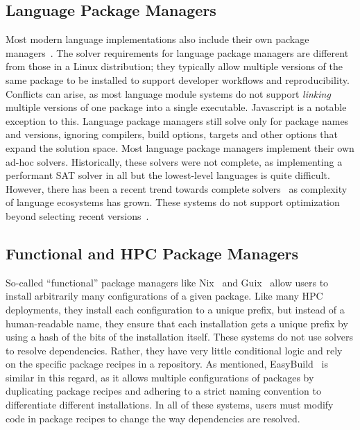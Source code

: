 \subsection{Language Package Managers}

Most modern language implementations also include their own package
managers~\cite{npm,pip,cargo,weizenbaum:pubgrub18}. The solver requirements for language
package managers are different from those in a Linux distribution; they typically allow
multiple versions of the same package to be installed to support developer workflows and
reproducibility. Conflicts can arise, as most language module systems do not support
{\it linking} multiple versions of one package into a single executable. Javascript is a
notable exception to this. Language package managers still solve only for package
names and versions, ignoring compilers, build options, targets and other options that
expand the solution space. Most language package managers implement their own ad-hoc
solvers. Historically, these solvers were not complete, as
implementing a performant SAT solver in all but the lowest-level languages is quite
difficult. However, there has been a recent trend towards complete
solvers~\cite{pip-new-resolver,weizenbaum:pubgrub18} as complexity of language
ecosystems has grown. These systems do not support optimization beyond selecting recent
versions~\cite{abate2020dependency}.

\subsection{Functional and HPC Package Managers}

So-called ``functional'' package managers like
Nix~\cite{dolstra+:icfp08,dolstra+:lisa04} and Guix~\cite{courtes-guix-2015} allow users
to install arbitrarily many configurations of a given package. Like many HPC
deployments, they install each configuration to a unique prefix, but instead of a
human-readable name, they ensure that each installation gets a unique prefix by using a
hash of the bits of the installation itself. These systems do not use solvers to resolve
dependencies. Rather, they have very little conditional logic and rely on the specific
package recipes in a repository. As mentioned, EasyBuild~\cite{hoste+:pyhpc12} is
similar in this regard, as it allows multiple configurations of packages by duplicating
package recipes and adhering to a strict naming convention to differentiate different
installations. In all of these systems, users must modify code in package recipes to
change the way dependencies are resolved.
